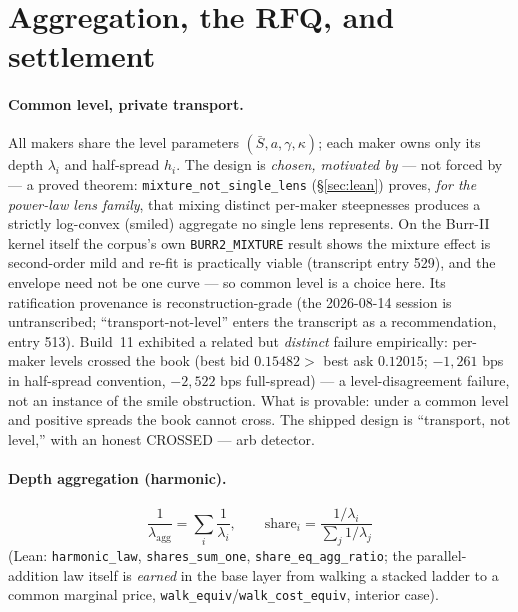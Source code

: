 \documentclass[11pt]{article}
\newcommand{\Sbar}{\bar{S}}
\begin{document}
\section{Aggregation, the RFQ, and settlement}\label{sec:agg}

\paragraph{Common level, private transport.} All makers share the level parameters
$(\Sbar,a,\gamma,\kappa)$; each maker owns only its depth $\lambda_i$ and half-spread $h_i$.
The design is \emph{chosen, motivated by} --- not forced by --- a proved theorem:
\texttt{mixture\_not\_single\_lens} (\S\ref{sec:lean}) proves, \emph{for the power-law lens
family}, that mixing distinct per-maker steepnesses produces a strictly log-convex (smiled)
aggregate no single lens represents. On the Burr-II kernel itself the corpus's own
\texttt{BURR2\_MIXTURE} result shows the mixture effect is second-order mild and re-fit is
practically viable (transcript entry 529), and the envelope need not be one curve --- so common
level is a choice here. Its ratification provenance is reconstruction-grade (the 2026-08-14
session is untranscribed; ``transport-not-level'' enters the transcript as a recommendation,
entry 513). Build~11 exhibited a related but \emph{distinct} failure empirically: per-maker
levels crossed the book (best bid $0.15482 >$ best ask $0.12015$; $-1{,}261$ bps in half-spread
convention, $-2{,}522$ bps full-spread) --- a level-disagreement failure, not an instance of the
smile obstruction. What is provable: under a common level and positive spreads the book cannot
cross. The shipped design is ``transport, not level,'' with an honest \textsf{CROSSED --- arb}
detector.

\paragraph{Depth aggregation (harmonic).}
\begin{equation}
\frac{1}{\lambda_{\text{agg}}} = \sum_i \frac{1}{\lambda_i}, \qquad
\text{share}_i = \frac{1/\lambda_i}{\sum_j 1/\lambda_j}
\end{equation}
(Lean: \texttt{harmonic\_law}, \texttt{shares\_sum\_one}, \texttt{share\_eq\_agg\_ratio}; the
parallel-addition law itself is \emph{earned} in the base layer from walking a stacked ladder
to a common marginal price, \texttt{walk\_equiv}/\texttt{walk\_cost\_equiv}, interior case).
\end{document}

